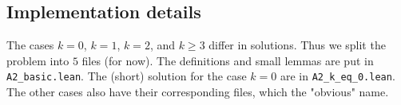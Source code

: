 \documentclass{article}
\begin{document}
\subsection*{Implementation details}

The cases $k = 0$, $k = 1$, $k = 2$, and $k \geq 3$ differ in solutions.
Thus we split the problem into $5$ files (for now).
The definitions and small lemmas are put in \texttt{A2\_basic.lean}.
The (short) solution for the case $k = 0$ are in \texttt{A2\_k\_eq\_0.lean}.
The other cases also have their corresponding files, which the "obvious" name.
\end{document}
